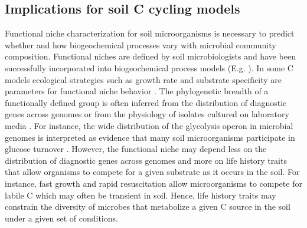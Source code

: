 \subsection{Implications for soil C cycling models}
Functional niche characterization for soil microorganisms is necessary to
predict whether and how biogeochemical processes vary with microbial community
composition. Functional niches are defined by soil microbiologists and have
been successfully incorporated into biogeochemical process models (E.g.
\citep{wieder_2014a,Kaiser2014a}). In some C models ecological strategies such
as growth rate and substrate specificity are parameters for functional niche
behavior \citep{Kaiser2014a}. The phylogenetic breadth of a functionally
defined group is often inferred from the distribution of diagnostic genes
across genomes \citep{Berlemont2013} or from the physiology of isolates
cultured on laboratory media \citep{Martiny2013}. For instance, the wide
distribution of the glycolysis operon in microbial genomes is interpreted
as evidence that many soil microorganisms participate in glucose turnover
\citep{McGuire2010}. However, the functional niche may depend less on the
distribution of diagnostic genes across genomes and more on life history
traits that allow organisms to compete for a given substrate as it occurs
in the soil. For instance, fast growth and rapid resuscitation allow
microorganisms to compete for labile C which may often be transient in
soil. Hence, life history traits may constrain the diversity of microbes
that metabolize a given C source in the soil under a given set of
conditions.

